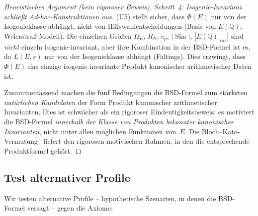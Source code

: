 \documentclass[aps,prd,twocolumn,superscriptaddress,nofootinbib,floatfix]{revtex4-2}
\theoremstyle{definition}
\theoremstyle{remark}
\DeclareMathOperator{\Sha}{Sha}
\begin{document}
\begin{proof}[Heuristisches Argument (kein rigoroser Beweis)]
\textit{Schritt~4: Isogenie-Invarianz schließt Ad-hoc-Konstruktionen aus.} (U5) stellt sicher, dass $\Phi(E)$ nur von der Isogenieklasse abhängt, nicht von Hilfswahlentscheidungen (Basis von $E(\mathbb{Q})$, Weierstraß-Modell). Die einzelnen Größen $\Omega_E$, $R_E$, $c_p$, $|\Sha|$, $|E(\mathbb{Q})_{\mathrm{tors}}|$ sind \textit{nicht} einzeln isogenie-invariant, aber ihre Kombination in der BSD-Formel ist es, da $L(E,s)$ nur von der Isogenieklasse abhängt (Faltings). Dies erzwingt, dass $\Phi(E)$ das einzige isogenie-invariante Produkt kanonischer arithmetischer Daten ist.

Zusammenfassend machen die fünf Bedingungen die BSD-Formel zum stärksten \textit{natürlichen Kandidaten} der Form \glqq Produkt kanonischer arithmetischer Invarianten\grqq{}. Dies ist schwächer als ein rigoroser Eindeutigkeitsbeweis: es motiviert die BSD-Formel \textit{innerhalb der Klasse von Produkten bekannter kanonischer Invarianten}, nicht unter allen möglichen Funktionen von~$E$. Die Bloch--Kato-Vermutung~\cite{BlochKato1990} liefert den rigorosen motivischen Rahmen, in den die entsprechende Produktformel gehört.
\end{proof}

\subsection{Test alternativer Profile}

Wir testen \glqq alternative Profile\grqq{} -- hypothetische Szenarien, in denen die BSD-Formel versagt -- gegen die Axiome:
\end{document}
